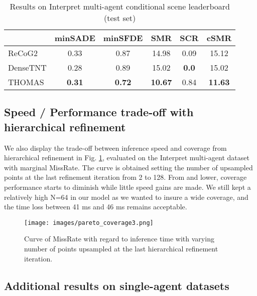 \documentclass{article} \usepackage{iclr2022_conference,times}
\begin{document}
\begin{table*}[h]
\caption{Results on Interpret multi-agent conditional scene leaderboard (test set)}
    \begin{center}
    \begin{tabular}{l|c c c c c}
      \hline
      & minSADE & minSFDE&SMR& SCR& cSMR \\
      \hline
ReCoG2 \citep{mo2020recog} &  0.33 & 0.87 & 14.98 & 0.09 & 15.12\\
      DenseTNT \citep{gu2021densetnt} & 0.28 & 0.89 & 15.02 & \textbf{0.0} & 15.02 \\
      \hline
      THOMAS &  \textbf{0.31} & \textbf{0.72} & \textbf{10.67} & 0.84 & \textbf{11.63}\\

      \hline
    \end{tabular}
    \end{center}
    \label{tab:interpret_challenge}
\end{table*}

\subsection{Speed / Performance trade-off with hierarchical refinement}

We also display the trade-off between inference speed and coverage from hierarchical refinement in Fig. \ref{fig:pareto}, evaluated on the Interpret multi-agent dataset with marginal MissRate. The curve is obtained setting the number  of upsampled points at the last refinement iteration from 2 to 128.  From  and lower, coverage performance starts to diminish while little speed gains are made. We still kept a relatively high N=64 in our model as we wanted to insure a wide coverage, and the time loss between 41 ms and 46 ms remains acceptable.
\begin{figure}[h]
\centerline{\texttt{[image: images/pareto\_coverage3.png]}}
\caption{Curve of MissRate with regard to inference time with varying number of points upsampled at the last hierarchical refinement iteration. }
\label{fig:pareto}
\end{figure}



\subsection{Additional results on single-agent datasets}
\label{sec:single_eval}
\end{document}
